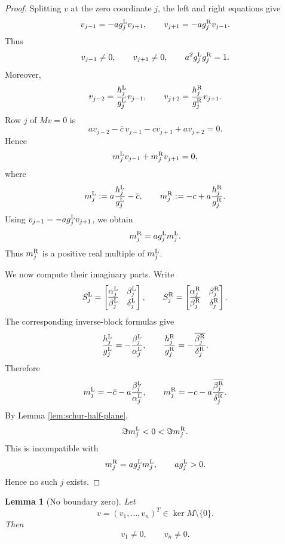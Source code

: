 \documentclass[11pt]{amsart}
\numberwithin{equation}{section}
\newtheorem{lemma}[theorem]{Lemma}
\begin{document}
\begin{proof}
Splitting \(v\) at the zero coordinate \(j\), the left and right equations give
\[
v_{j-1}=-ag_j^{\rm L}v_{j+1},
\qquad
v_{j+1}=-ag_j^{\rm R}v_{j-1}.
\]
Thus
\[
v_{j-1}\ne0,
\qquad
v_{j+1}\ne0,
\qquad
a^2g_j^{\rm L}g_j^{\rm R}=1.
\]
Moreover,
\[
v_{j-2}
=
\frac{h_j^{\rm L}}{g_j^{\rm L}}v_{j-1},
\qquad
v_{j+2}
=
\frac{h_j^{\rm R}}{g_j^{\rm R}}v_{j+1}.
\]
Row \(j\) of \(Mv=0\) is
\[
av_{j-2}-\overline c\,v_{j-1}-cv_{j+1}+av_{j+2}=0.
\]
Hence
\[
m_j^{\rm L}v_{j-1}+m_j^{\rm R}v_{j+1}=0,
\]
where
\[
m_j^{\rm L}
:=
a\frac{h_j^{\rm L}}{g_j^{\rm L}}-\overline c,
\qquad
m_j^{\rm R}
:=
-c+a\frac{h_j^{\rm R}}{g_j^{\rm R}}.
\]
Using \(v_{j-1}=-ag_j^{\rm L}v_{j+1}\), we obtain
\[
m_j^{\rm R}=ag_j^{\rm L}m_j^{\rm L}.
\]
Thus \(m_j^{\rm R}\) is a positive real multiple of \(m_j^{\rm L}\).

We now compute their imaginary parts.  Write
\[
S_j^{\rm L}
=
\begin{bmatrix}
\alpha_j^{\rm L} & \beta_j^{\rm L}\\
\overline{\beta_j^{\rm L}} & \delta_j^{\rm L}
\end{bmatrix},
\qquad
S_j^{\rm R}
=
\begin{bmatrix}
\alpha_j^{\rm R} & \beta_j^{\rm R}\\
\overline{\beta_j^{\rm R}} & \delta_j^{\rm R}
\end{bmatrix}.
\]
The corresponding inverse-block formulas give
\[
\frac{h_j^{\rm L}}{g_j^{\rm L}}
=
-\frac{\beta_j^{\rm L}}{\alpha_j^{\rm L}},
\qquad
\frac{h_j^{\rm R}}{g_j^{\rm R}}
=
-\frac{\overline{\beta_j^{\rm R}}}{\delta_j^{\rm R}}.
\]
Therefore
\[
m_j^{\rm L}
=
-\overline c-a\frac{\beta_j^{\rm L}}{\alpha_j^{\rm L}},
\qquad
m_j^{\rm R}
=
-c-a\frac{\overline{\beta_j^{\rm R}}}{\delta_j^{\rm R}}.
\]
By Lemma \ref{lem:schur-half-plane},
\[
\Im m_j^{\rm L}<0<\Im m_j^{\rm R}.
\]
This is incompatible with
\[
m_j^{\rm R}=ag_j^{\rm L}m_j^{\rm L},
\qquad
ag_j^{\rm L}>0.
\]
Hence no such \(j\) exists.
\end{proof}

\begin{lemma}[No boundary zero]\label{lem:no-boundary-zero}
Let
\[
v=(v_1,\dots,v_n)^T\in\ker M\setminus\{0\}.
\]
Then
\[
v_1\ne0,
\qquad
v_n\ne0.
\]
\end{lemma}
\end{document}
